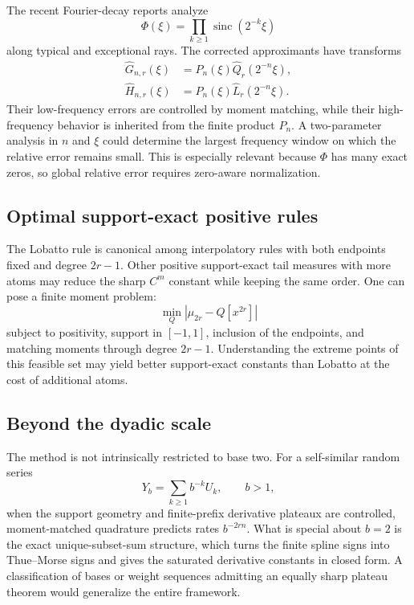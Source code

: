 \documentclass[11pt]{article}
\numberwithin{equation}{section}
\theoremstyle{definition}
\theoremstyle{remark}
\newcommand{\sinc}{\operatorname{sinc}}
\newcommand{\abs}[1]{\left|#1\right|}
\begin{document}
The recent Fourier-decay reports analyze
\[
 \Phi(\xi)=\prod_{k\ge1}\sinc(2^{-k}\xi)
\]
along typical and exceptional rays.  The corrected approximants have transforms
\begin{align}
 \widehat G_{n,r}(\xi)&=P_n(\xi)\widehat Q_r(2^{-n}\xi),\label{p1:eq:G-Fourier}\\
 \widehat H_{n,r}(\xi)&=P_n(\xi)\widehat L_r(2^{-n}\xi).
 \label{p1:eq:H-Fourier}
\end{align}
Their low-frequency errors are controlled by moment matching, while their high-frequency behavior is inherited from the finite product $P_n$.  A two-parameter analysis in $n$ and $\xi$ could determine the largest frequency window on which the relative error remains small.  This is especially relevant because $\Phi$ has many exact zeros, so global relative error requires zero-aware normalization.

\subsection{Optimal support-exact positive rules}

The Lobatto rule is canonical among interpolatory rules with both endpoints fixed and degree $2r-1$.  Other positive support-exact tail measures with more atoms may reduce the sharp $C^m$ constant while keeping the same order.  One can pose a finite moment problem:
\begin{equation}
 \min_Q \abs{\mu_{2r}-Q[x^{2r}]}
 \label{p1:eq:moment-optimization}
\end{equation}
subject to positivity, support in $[-1,1]$, inclusion of the endpoints, and matching moments through degree $2r-1$.  Understanding the extreme points of this feasible set may yield better support-exact constants than Lobatto at the cost of additional atoms.

\subsection{Beyond the dyadic scale}

The method is not intrinsically restricted to base two.  For a self-similar random series
\[
 Y_b=\sum_{k\ge1}b^{-k}U_k,
 \qquad b>1,
\]
when the support geometry and finite-prefix derivative plateaux are controlled, moment-matched quadrature predicts rates $b^{-2rn}$.  What is special about $b=2$ is the exact unique-subset-sum structure, which turns the finite spline signs into Thue--Morse signs and gives the saturated derivative constants in closed form.  A classification of bases or weight sequences admitting an equally sharp plateau theorem would generalize the entire framework.
\end{document}
